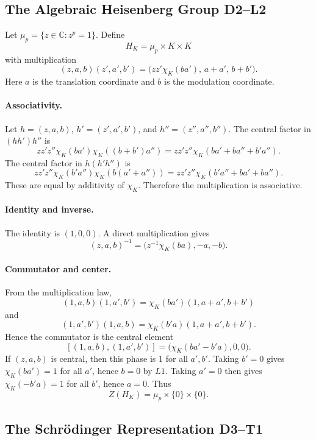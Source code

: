 \subsection{The Algebraic Heisenberg Group D2--L2}

Let \(\mu_p=\{z\in\mathbb C:z^p=1\}\).  Define
\[
  H_K=\mu_p\times K\times K
\]
with multiplication
\[
  (z,a,b)(z',a',b')
  =
  \bigl(zz'\chi_K(ba'),\,a+a',\,b+b'\bigr).
\]
Here \(a\) is the translation coordinate and \(b\) is the modulation
coordinate.

\paragraph{Associativity.}
Let \(h=(z,a,b)\), \(h'=(z',a',b')\), and \(h''=(z'',a'',b'')\).  The central
factor in \((hh')h''\) is
\[
  zz'z''\chi_K(ba')\chi_K((b+b')a'')
  =
  zz'z''\chi_K(ba'+ba''+b'a'').
\]
The central factor in \(h(h'h'')\) is
\[
  zz'z''\chi_K(b'a'')\chi_K(b(a'+a''))
  =
  zz'z''\chi_K(b'a''+ba'+ba'').
\]
These are equal by additivity of \(\chi_K\).  Therefore the multiplication is
associative.

\paragraph{Identity and inverse.}
The identity is \((1,0,0)\).  A direct multiplication gives
\[
  (z,a,b)^{-1}=\bigl(z^{-1}\chi_K(ba),-a,-b\bigr).
\]

\paragraph{Commutator and center.}
From the multiplication law,
\[
  (1,a,b)(1,a',b')
  =
  \chi_K(ba')(1,a+a',b+b')
\]
and
\[
  (1,a',b')(1,a,b)
  =
  \chi_K(b'a)(1,a+a',b+b').
\]
Hence the commutator is the central element
\[
  [(1,a,b),(1,a',b')]
  =
  \bigl(\chi_K(ba'-b'a),0,0\bigr).
\]
If \((z,a,b)\) is central, then this phase is \(1\) for all \(a',b'\).  Taking
\(b'=0\) gives \(\chi_K(ba')=1\) for all \(a'\), hence \(b=0\) by \(L1\).
Taking \(a'=0\) then gives \(\chi_K(-b'a)=1\) for all \(b'\), hence \(a=0\).
Thus
\[
  Z(H_K)=\mu_p\times\{0\}\times\{0\}.
\]

\subsection{The Schrödinger Representation D3--T1}

